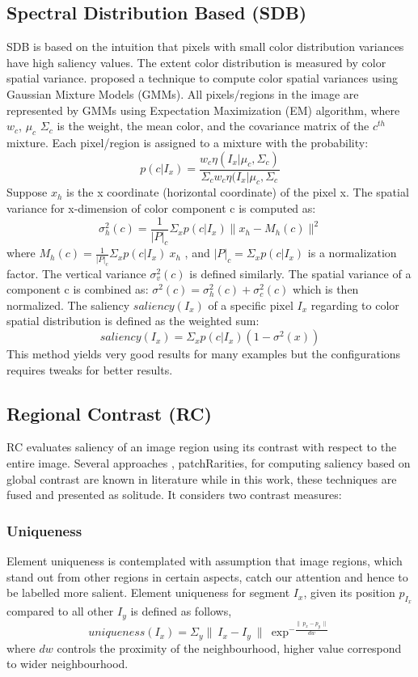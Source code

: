 \subsection{Spectral Distribution Based (SDB)} 
SDB is based on the intuition that pixels with small color distribution variances have high saliency values. The extent color distribution is measured by color spatial variance. \cite{spectralSal} proposed a technique to compute color spatial variances using Gaussian Mixture Models (GMMs). All pixels/regions in the image are represented by GMMs using Expectation Maximization (EM) algorithm, where $w_{c}$, $\mu_{c}$ $\Sigma_{c}$ is the weight, the mean color, and the covariance matrix of the $c^{th}$ mixture. Each pixel/region is assigned to a mixture with the probability:
$$p(c | I_{x}) = \frac{w_{c}\eta(I_{x}| \mu_{c},\Sigma_{c})}{\Sigma_{c}w_{c}\eta(I_{x}| \mu_{c},\Sigma_{c}} $$
Suppose $x_{h}$ is the x coordinate (horizontal coordinate) of the pixel x. The spatial variance for x-dimension of color component c is computed as:
$$\sigma_{h}^{2}(c) = \frac{1}{|P|_{c}}\Sigma_{x}	p(c | I_{x}) \parallel x_{h} -M_{h}(c) \parallel^{2}$$
where $M_{h}(c) = \frac{1}{|P|_{c}}\Sigma_{x}p(c|I_{x})~x_h$ , and $|P|_{c} = \Sigma_{x}p(c | I_{x})$ is a normalization factor. The vertical variance $\sigma_{v}^{2}(c)$ is defined similarly. The spatial variance of a component c is combined as: $\sigma^{2}(c) = \sigma_{h}^{2}(c) + \sigma_{c}^{2}(c)$ which is then normalized.
The saliency $saliency(I_{x})$ of a specific pixel $I_{x}$ regarding to color spatial
distribution is defined as the weighted sum:
$$saliency(I_{x}) = \Sigma_{x}p(c | I_{x})(1-\sigma^{2}(x))$$
This method yields very good results for many examples but the configurations requires tweaks for better results.

\subsection{Regional Contrast (RC)}
RC evaluates saliency of an image region using its contrast with respect to the entire image. Several approaches  \citep{globContrast}, {patchRarities}, \citep{salFilters} for computing saliency based on global contrast are known in literature while in this work, these techniques are fused and presented as solitude.
It considers two contrast measures:
\subsubsection{Uniqueness}
Element uniqueness is contemplated with  assumption that image regions, which stand out from other regions in certain aspects, catch our attention and hence to be labelled more salient. Element uniqueness for segment $I_{x}$, given its position $p_{I_{x}}$ compared to all other $I_{y}$ is defined as follows,
$$uniqueness(I_{x}) = \Sigma_{y} \parallel~I_{x} -I_{y}~\parallel~\exp^{-\frac{\parallel~p_{x} - p_{y}~\parallel}{dw}}$$
where $dw$ controls the proximity of the neighbourhood, higher value correspond to wider neighbourhood.
